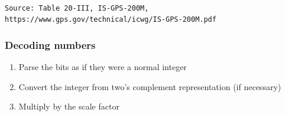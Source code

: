 \documentclass[aspectratio=169, xcolor=table]{beamer}
\begin{document}
\begin{frame}
    \\ \texttt{\tiny{Source: Table 20-III, IS-GPS-200M, https://www.gps.gov/technical/icwg/IS-GPS-200M.pdf}}
\end{frame}

\begin{frame}
    \frametitle{Decoding numbers}

    \begin{enumerate}
        \item<2-> Parse the bits as if they were a normal integer

        \item<3-> Convert the integer from two's complement representation (if necessary)

        \item<4-> Multiply by the scale factor
    \end{enumerate}
\end{frame}
\end{document}

